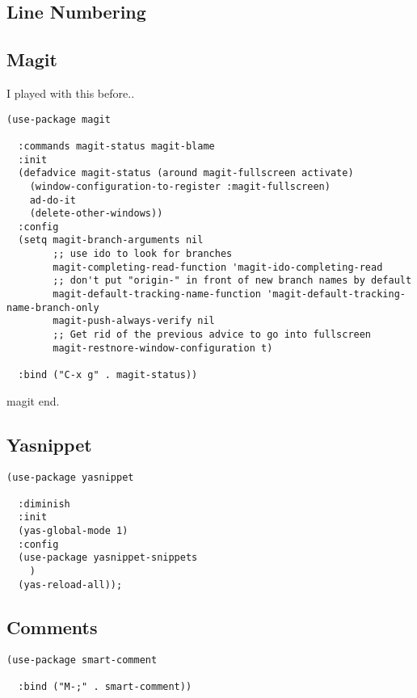\documentclass[12pt]{article}
\begin{document}
\subsection{Line Numbering}
\label{sec:org5bd63ab}

\subsection{Magit}
\label{sec:org46041d0}

I played with this before.. 

\begin{verbatim}
(use-package magit

  :commands magit-status magit-blame
  :init
  (defadvice magit-status (around magit-fullscreen activate)
    (window-configuration-to-register :magit-fullscreen)
    ad-do-it
    (delete-other-windows))
  :config
  (setq magit-branch-arguments nil
        ;; use ido to look for branches
        magit-completing-read-function 'magit-ido-completing-read
        ;; don't put "origin-" in front of new branch names by default
        magit-default-tracking-name-function 'magit-default-tracking-name-branch-only
        magit-push-always-verify nil
        ;; Get rid of the previous advice to go into fullscreen
        magit-restnore-window-configuration t)

  :bind ("C-x g" . magit-status))

\end{verbatim}

magit end.    

\subsection{Yasnippet}
\label{sec:org975f4f4}

\begin{verbatim}
(use-package yasnippet

  :diminish
  :init
  (yas-global-mode 1)
  :config
  (use-package yasnippet-snippets
    )
  (yas-reload-all));
\end{verbatim}

\subsection{Comments}
\label{sec:org66a7f14}
\begin{verbatim}
(use-package smart-comment

  :bind ("M-;" . smart-comment))
\end{verbatim}
\end{document}
